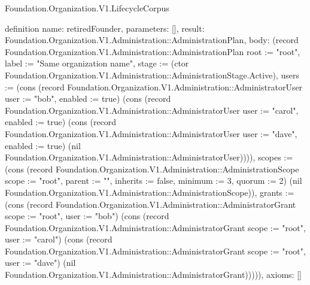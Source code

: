 \begin{lexlean}{Foundation.Organization.V1.LifecycleCorpus}
\begin{semanticmodule}
definition{
  name: retiredFounder,
  parameters: [],
  result: Foundation.Organization.V1.Administration::AdministrationPlan,
  body: (record Foundation.Organization.V1.Administration::AdministrationPlan {root := "root", label := "Same organization name", stage := (ctor Foundation.Organization.V1.Administration::AdministrationStage.Active), users := (cons (record Foundation.Organization.V1.Administration::AdministratorUser {user := "bob", enabled := true}) (cons (record Foundation.Organization.V1.Administration::AdministratorUser {user := "carol", enabled := true}) (cons (record Foundation.Organization.V1.Administration::AdministratorUser {user := "dave", enabled := true}) (nil Foundation.Organization.V1.Administration::AdministratorUser)))), scopes := (cons (record Foundation.Organization.V1.Administration::AdministrationScope {scope := "root", parent := "", inherits := false, minimum := 3, quorum := 2}) (nil Foundation.Organization.V1.Administration::AdministrationScope)), grants := (cons (record Foundation.Organization.V1.Administration::AdministratorGrant {scope := "root", user := "bob"}) (cons (record Foundation.Organization.V1.Administration::AdministratorGrant {scope := "root", user := "carol"}) (cons (record Foundation.Organization.V1.Administration::AdministratorGrant {scope := "root", user := "dave"}) (nil Foundation.Organization.V1.Administration::AdministratorGrant))))}),
  axioms: []
}


\end{semanticmodule}
\end{lexlean}
